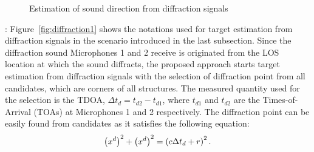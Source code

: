 \documentclass[letterpaper, 10 pt, conference]{ieeeconf}  %
\begin{document}
\begin{figure}[ht]
	\centering
	\caption{\footnotesize {Estimation of sound direction from diffraction signals} }
	\label{fig:diffraction}
\end{figure}
: Figure~\ref{fig:diffraction1} shows the notations used for target estimation from diffraction signals in the scenario introduced in the last subsection.  Since the diffraction sound Microphones 1 and 2 receive is originated from the LOS location at which the sound diffracts, the proposed approach starts target estimation from diffraction signals with the selection of diffraction point from all candidates, which are corners of all structures.  The measured quantity used for the selection is the TDOA, $\Delta t_d = t_{d2} - t_{d1}$, where $t_{d1}$ and $t_{d2}$ are the Times-of-Arrival (TOAs) at Microphones 1 and 2 respectively.  The diffraction point can be easily found from candidates as it satisfies the following equation:  
\begin{equation}\label{eq:TDOA1}
\left ( x^d \right )^2 + \left ( x^d \right )^2 = \left ( c \Delta t_d + r \right )^2.  
\end{equation}
\end{document}
